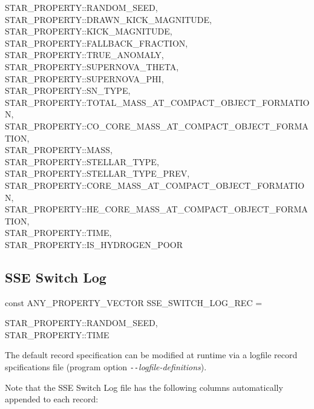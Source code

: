 \hfill
\begin{minipage}{\dimexpr\textwidth-2em}
    STAR\_PROPERTY::RANDOM\_SEED, \\
    STAR\_PROPERTY::DRAWN\_KICK\_MAGNITUDE, \\
    STAR\_PROPERTY::KICK\_MAGNITUDE, \\
    STAR\_PROPERTY::FALLBACK\_FRACTION, \\
    STAR\_PROPERTY::TRUE\_ANOMALY, \\				
    STAR\_PROPERTY::SUPERNOVA\_THETA, \\
    STAR\_PROPERTY::SUPERNOVA\_PHI, \\
    STAR\_PROPERTY::SN\_TYPE, \\
    STAR\_PROPERTY::TOTAL\_MASS\_AT\_COMPACT\_OBJECT\_FORMATION, \\
    STAR\_PROPERTY::CO\_CORE\_MASS\_AT\_COMPACT\_OBJECT\_FORMATION, \\
    STAR\_PROPERTY::MASS, \\
    STAR\_PROPERTY::STELLAR\_TYPE, \\
    STAR\_PROPERTY::STELLAR\_TYPE\_PREV, \\
    STAR\_PROPERTY::CORE\_MASS\_AT\_COMPACT\_OBJECT\_FORMATION, \\
    STAR\_PROPERTY::HE\_CORE\_MASS\_AT\_COMPACT\_OBJECT\_FORMATION, \\
    STAR\_PROPERTY::TIME, \\
    STAR\_PROPERTY::IS\_HYDROGEN\_POOR
\end{minipage}
\par\rcb{;}

\newpage
\subsection{SSE Switch Log}\label{sec:SSESwitchLog}

const ANY\_PROPERTY\_VECTOR SSE\_SWITCH\_LOG\_REC = \lcb

\hfill
\begin{minipage}{\dimexpr\textwidth-2em}
    STAR\_PROPERTY::RANDOM\_SEED, \\
    STAR\_PROPERTY::TIME
\end{minipage}
\par\rcb{;}


\bigskip
The default record specification can be modified at runtime via a logfile record spcifications file (program option \textit{\texttt{-{}-}logfile-definitions}).

Note that the SSE Switch Log file has the following columns automatically appended to each record:

